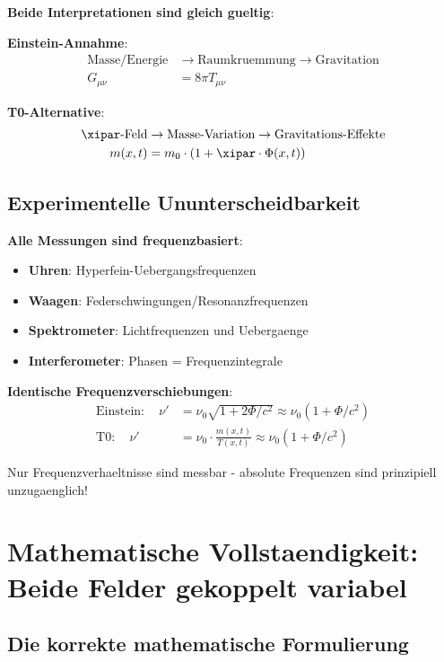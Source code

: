 	\textbf{Beide Interpretationen sind gleich gueltig}:
	
	\textbf{Einstein-Annahme}:
	\begin{align}
		\text{Masse/Energie} &\rightarrow \text{Raumkruemmung} \rightarrow \text{Gravitation} \\
		G_{\mu\nu} &= 8\pi T_{\mu\nu}
	\end{align}
	
	\textbf{T0-Alternative}:
	\begin{align}
		\xipar\text{-Feld} &\rightarrow \text{Masse-Variation} \rightarrow \text{Gravitations-Effekte} \\
		m(x,t) &= m_0 \cdot (1 + \xipar \cdot \Phi(x,t))
	\end{align}
	
	\subsection{Experimentelle Ununterscheidbarkeit}
	
	\textbf{Alle Messungen sind frequenzbasiert}:
	\begin{itemize}
		\item \textbf{Uhren}: Hyperfein-Uebergangsfrequenzen
		\item \textbf{Waagen}: Federschwingungen/Resonanzfrequenzen
		\item \textbf{Spektrometer}: Lichtfrequenzen und Uebergaenge
		\item \textbf{Interferometer}: Phasen = Frequenzintegrale
	\end{itemize}
	
	\textbf{Identische Frequenzverschiebungen}:
	\begin{align}
		\text{Einstein}: \quad \nu' &= \nu_0 \sqrt{1 + 2\Phi/c^2} \approx \nu_0 (1 + \Phi/c^2) \\
		\text{T0}: \quad \nu' &= \nu_0 \cdot \frac{m(x,t)}{T(x,t)} \approx \nu_0 (1 + \Phi/c^2)
	\end{align}
	
	Nur Frequenzverhaeltnisse sind messbar - absolute Frequenzen sind prinzipiell unzugaenglich!
	
	\section{Mathematische Vollstaendigkeit: Beide Felder gekoppelt variabel}
	
	\subsection{Die korrekte mathematische Formulierung}
	
